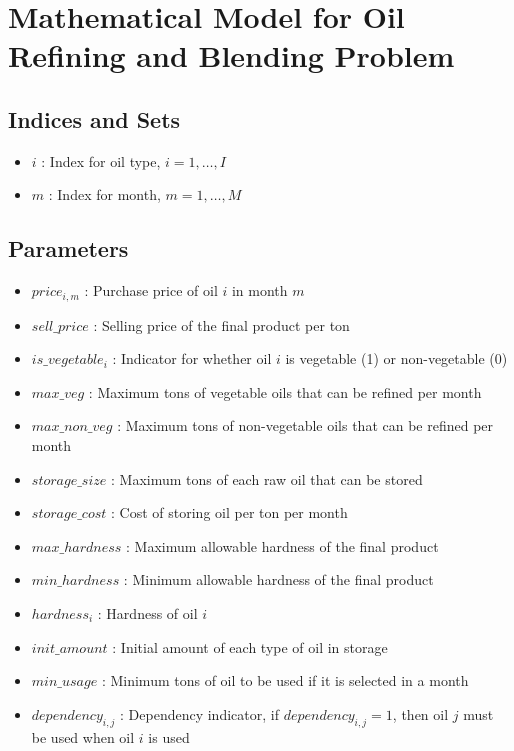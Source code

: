 \documentclass{article}
\begin{document}
\section*{Mathematical Model for Oil Refining and Blending Problem}

\subsection*{Indices and Sets}
\begin{itemize}
    \item \( i \) : Index for oil type, \( i = 1, \ldots, I \)
    \item \( m \) : Index for month, \( m = 1, \ldots, M \)
\end{itemize}

\subsection*{Parameters}
\begin{itemize}
    \item \( price_{i,m} \) : Purchase price of oil \( i \) in month \( m \)
    \item \( sell\_price \) : Selling price of the final product per ton
    \item \( is\_vegetable_{i} \) : Indicator for whether oil \( i \) is vegetable (1) or non-vegetable (0)
    \item \( max\_veg \) : Maximum tons of vegetable oils that can be refined per month
    \item \( max\_non\_veg \) : Maximum tons of non-vegetable oils that can be refined per month
    \item \( storage\_size \) : Maximum tons of each raw oil that can be stored
    \item \( storage\_cost \) : Cost of storing oil per ton per month
    \item \( max\_hardness \) : Maximum allowable hardness of the final product
    \item \( min\_hardness \) : Minimum allowable hardness of the final product
    \item \( hardness_{i} \) : Hardness of oil \( i \)
    \item \( init\_amount \) : Initial amount of each type of oil in storage
    \item \( min\_usage \) : Minimum tons of oil to be used if it is selected in a month
    \item \( dependency_{i, j} \) : Dependency indicator, if \( dependency_{i, j} = 1 \), then oil \( j \) must be used when oil \( i \) is used
\end{itemize}
\end{document}
